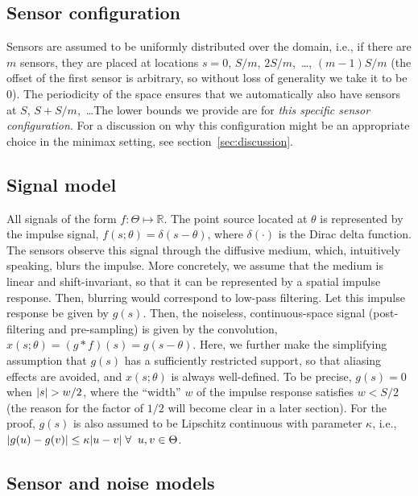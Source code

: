 \documentclass[conference]{IEEEtran}
\DeclarePairedDelimiter\abs{\lvert}{\rvert}
\begin{document}
\subsection{Sensor configuration}

Sensors are assumed to be uniformly distributed over the domain, i.e., if there
are $m$ sensors, they are placed at locations $s = 0$, $S/m$, $2S/m$,~\dots,
$(m{-}1)S/m$ (the offset of the first sensor is arbitrary, so without loss of
generality we take it to be 0). The periodicity of the space ensures that we
automatically also have sensors at $S$, $S{+}S/m$,~\dots\@ The lower bounds we
provide are for \emph{this specific sensor configuration}. For a discussion on
why this configuration might be an appropriate choice in the minimax setting,
see section~\ref{sec:discussion}.

\subsection{Signal model}
\label{sec:signal-model}

All signals of the form $f:\Theta\mapsto\mathbb{R}$.  The point source located at $\theta$
is represented by the impulse signal, $f(s;\theta) = \delta(s - \theta)$, where
$\delta(\cdot)$ is the Dirac delta function.  The sensors observe this signal
through the diffusive medium, which, intuitively speaking, blurs the impulse.
More concretely, we assume that the medium is linear and shift-invariant, so
that it can be represented by a spatial impulse response. Then, blurring would
correspond to low-pass filtering.  Let this impulse response be given by
$g(s)$. Then, the noiseless, continuous-space signal (post-filtering and
pre-sampling) is given by the convolution, $x(s; \theta) = (g*f)(s) = g(s -
\theta)$. Here, we further make the simplifying assumption that $g(s)$ has a
sufficiently restricted support, so that aliasing effects are avoided, and
$x(s; \theta)$ is always well-defined. To be precise, $g(s) = 0$ when $\abs{s}
> w/2$, where the ``width'' $w$ of the impulse response satisfies $w < S / 2$
(the reason for the factor of $1/2$ will become clear in a later section). For
the proof, $g(s)$ is also assumed to be Lipschitz continuous with parameter
$\kappa$, i.e., $\abs{g(u) - g(v)} \leq \kappa \abs{u - v} \; \forall \;\; u, v
\in \Theta$.

\subsection{Sensor and noise models}
\label{sec:sensor-model}
\end{document}
